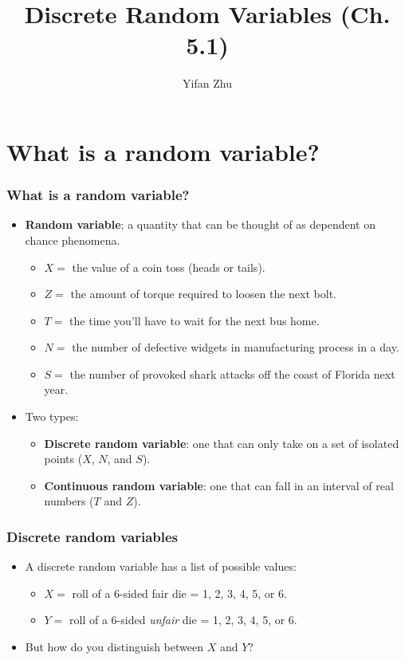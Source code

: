 \documentclass[handout]{beamer}\usepackage[]{graphicx}\usepackage[]{color}
\title{Discrete Random Variables (Ch. 5.1)}
\author{Yifan Zhu}
\date{}
\institute{Iowa State University}
\numberwithin{equation}{section}
\begin{document}
\begin{frame}
\titlepage
 \end{frame}
 

\section{What is a random variable?}

\begin{frame}
\frametitle{What is a random variable?}
\begin{itemize}
\pause \item {\bf Random variable}; a quantity that can be thought of as dependent on chance phenomena.
\begin{itemize}
\pause \item $X = $ the value of a coin toss (heads or tails).
\pause \item $Z = $ the amount of torque required to loosen the next bolt.
\pause \item $T = $ the time you'll have to wait for the next bus home.
\pause \item $N = $ the number of defective widgets in manufacturing process in a day.
\pause \item $S = $ the number of provoked shark attacks off the coast of Florida next year.
\end{itemize}
\pause \item Two types:
\begin{itemize}
\pause \item {\bf Discrete random variable}: one that can only take on a set of isolated points ($X$, $N$, and $S$).
\pause \item {\bf Continuous random variable}: one that can fall in an interval of real numbers ($T$ and $Z$). 
\end{itemize}
\end{itemize}
\end{frame}

\begin{frame}
\frametitle{Discrete random variables}
\begin{itemize}
\pause \item A discrete random variable has a list of possible values:
\begin{itemize}
\pause \item $X = $ roll of a 6-sided fair die = 1, 2, 3, 4, 5, or 6.
\pause \item $Y = $ roll of a 6-sided \emph{unfair} die = 1, 2, 3, 4, 5, or 6. 
\end{itemize}
\pause \item But how do you distinguish between $X$ and $Y$?
\end{itemize}
\end{frame}
\end{document}
